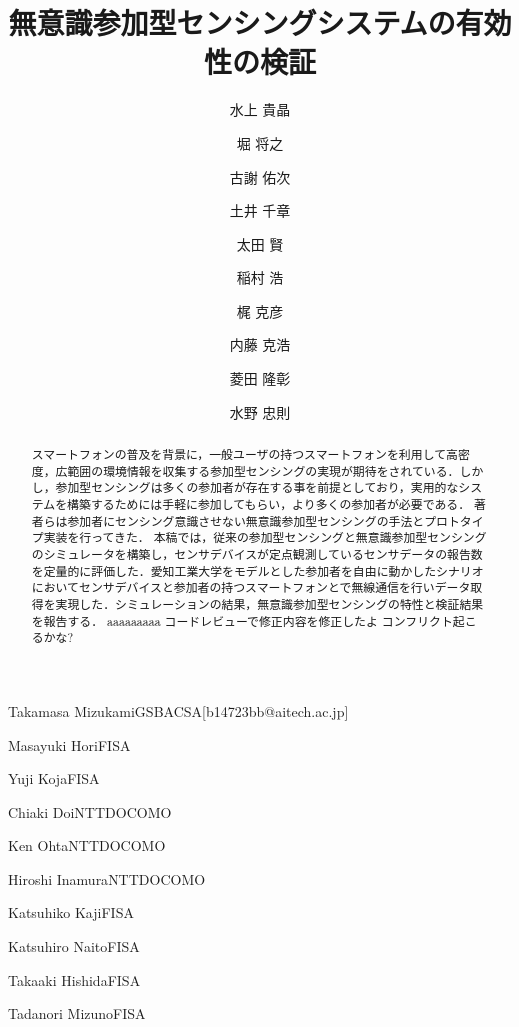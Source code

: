 \documentclass[submit,techrep]{ipsj}
\begin{document}
\title{無意識参加型センシングシステムの有効性の検証}






\author{水上 貴晶}{Takamasa Mizukami}{GSBACSA}[b14723bb@aitech.ac.jp]
\author{堀 将之}{Masayuki Hori}{FISA}%
\author{古謝 佑次}{Yuji Koja}{FISA}%
\author{土井 千章}{Chiaki Doi}{NTTDOCOMO}%
\author{太田 賢}{Ken Ohta}{NTTDOCOMO}%
\author{稲村 浩}{Hiroshi Inamura}{NTTDOCOMO}%
\author{梶 克彦}{Katsuhiko Kaji}{FISA}%
\author{内藤 克浩}{Katsuhiro Naito}{FISA}%
\author{菱田 隆彰}{Takaaki Hishida}{FISA}%
\author{水野 忠則}{Tadanori Mizuno}{FISA}%


\begin{abstract}
スマートフォンの普及を背景に，一般ユーザの持つスマートフォンを利用して高密度，広範囲の環境情報を収集する参加型センシングの実現が期待をされている．しかし，参加型センシングは多くの参加者が存在する事を前提としており，実用的なシステムを構築するためには手軽に参加してもらい，より多くの参加者が必要である．
著者らは参加者にセンシング意識させない無意識参加型センシングの手法とプロトタイプ実装を行ってきた．
本稿では，従来の参加型センシングと無意識参加型センシングのシミュレータを構築し，センサデバイスが定点観測しているセンサデータの報告数を定量的に評価した．愛知工業大学をモデルとした参加者を自由に動かしたシナリオにおいてセンサデバイスと参加者の持つスマートフォンとで無線通信を行いデータ取得を実現した．シミュレーションの結果，無意識参加型センシングの特性と検証結果を報告する．
aaaaaaaaa
コードレビューで修正内容を修正したよ
コンフリクト起こるかな?
\end{abstract}
\end{document}
